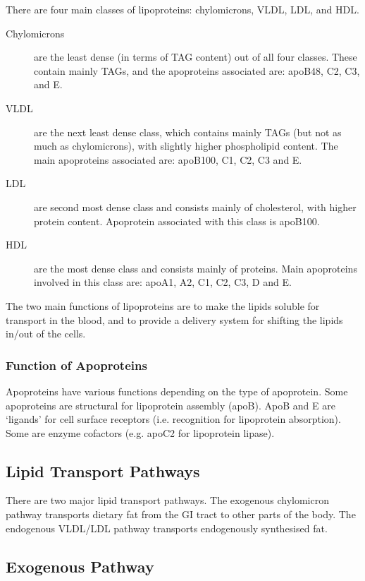 \documentclass[a4paper, 12pt]{report}
\begin{document}
There are four main classes of lipoproteins: chylomicrons, VLDL, LDL, and HDL.
\begin{description}
\item[Chylomicrons] are the least dense (in terms of TAG content) out of all four classes. These contain mainly TAGs, and the apoproteins associated are: apoB48, C2, C3, and E.
\item[VLDL] are the next least dense class, which contains mainly TAGs (but not as much as chylomicrons), with slightly higher phospholipid content. The main apoproteins associated are: apoB100, C1, C2, C3 and E.
\item[LDL] are second most dense class and consists mainly of cholesterol, with higher protein content. Apoprotein associated with this class is apoB100.
\item[HDL] are the most dense class and consists mainly of proteins. Main apoproteins involved in this class are: apoA1, A2, C1, C2, C3, D and E.
\end{description}

The two main functions of lipoproteins are to make the lipids soluble for transport in the blood, and to provide a delivery system for shifting the lipids in/out of the cells.

\subsubsection{Function of Apoproteins}

Apoproteins have various functions depending on the type of apoprotein.
Some apoproteins are structural for lipoprotein assembly (apoB).
ApoB and E are `ligands' for cell surface receptors (i.e. recognition for lipoprotein absorption).
Some are enzyme cofactors (e.g. apoC2 for lipoprotein lipase).

\subsection{Lipid Transport Pathways}

There  are two major lipid transport pathways.
The exogenous chylomicron pathway transports dietary fat from the GI tract to other parts of the body.
The endogenous VLDL/LDL pathway transports endogenously synthesised fat.

\subsection{Exogenous Pathway}
\end{document}
